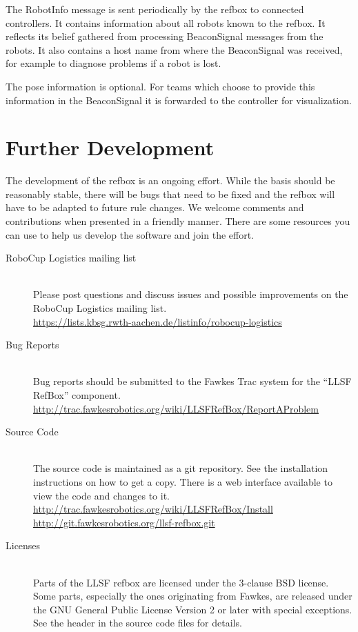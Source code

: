 \documentclass[a4paper]{article}
\begin{document}
%
{%
  The RobotInfo message is sent periodically by the refbox to
  connected controllers. It contains information about all robots
  known to the refbox. It reflects its belief gathered from processing
  BeaconSignal messages from the robots. It also contains a host name
  from where the BeaconSignal was received, for example to diagnose
  problems if a robot is lost.

  \medskip

  The pose information is optional. For teams which choose to provide
  this information in the BeaconSignal it is forwarded to the
  controller for visualization.
}

\section{Further Development}
\label{sec:dev}
The development of the refbox is an ongoing effort. While the basis
should be reasonably stable, there will be bugs that need to be fixed
and the refbox will have to be adapted to future rule changes. We
welcome comments and contributions when presented in a friendly
manner. There are some resources you can use to help us develop the
software and join the effort.

\begin{description}
\item[RoboCup Logistics mailing list] \hfill\\
  Please post questions and discuss issues and possible improvements
  on the RoboCup Logistics mailing list.\\
  \url{https://lists.kbsg.rwth-aachen.de/listinfo/robocup-logistics}
\item[Bug Reports] \hfill\\
  Bug reports should be submitted to the Fawkes Trac system for the
  ``LLSF RefBox'' component.\\
  \url{http://trac.fawkesrobotics.org/wiki/LLSFRefBox/ReportAProblem}
\item[Source Code] \hfill\\
  The source code is maintained as a git repository. See the
  installation instructions on how to get a copy. There is a web
  interface available to view the code and changes to it.\\
  \url{http://trac.fawkesrobotics.org/wiki/LLSFRefBox/Install}\\
  \url{http://git.fawkesrobotics.org/llsf-refbox.git}
\item[Licenses] \hfill\\
  Parts of the LLSF refbox are licensed under the 3-clause BSD
  license. Some parts, especially the ones originating from Fawkes,
  are released under the GNU General Public License Version 2 or later
  with special exceptions. See the header in the source code files for
  details.
\end{description}

{\small


}
\end{document}
